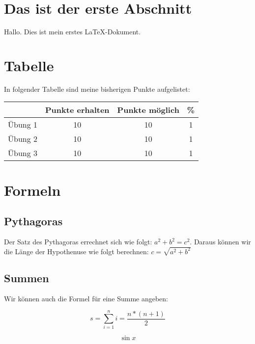 \documentclass{article}
\begin{document}
\maketitle

\section{Das ist der erste Abschnitt}
Hallo. Dies ist mein erstes \LaTeX -Dokument.
\section{Tabelle}
In folgender Tabelle sind meine bisherigen Punkte aufgelistet:
\begin{center}
\begin{tabular}{c|c|c|c}
 \ 					& Punkte erhalten 	& Punkte möglich 	& \% 	\\
\hline	\"Ubung 1 	& 10 				& 10 				& 1 	\\
		\"Ubung 2	& 10				& 10				& 1		\\
 		\"Ubung 3	& 10				& 10				& 1		\\
 		
\end{tabular}
\end{center}

\section{Formeln}
\subsection{Pythagoras}
Der Satz des Pythagoras errechnet sich wie folgt:
$ a^2+b^2=c^2 $.
Daraus k\"onnen wir die L\"ange der Hypothenuse wie folgt berechnen:
$ c=\sqrt{a^2+b^2}$
\subsection{Summen}
Wir können auch die Formel für eine Summe angeben:

\begin{center}
\begin{equation}
s=\sum\limits_{i=1}^n i=\frac{n*(n+1)}{2}
\end{equation}

\end{center}

\begin{equation}
\sin x
\end{equation}



   
\end{document}
